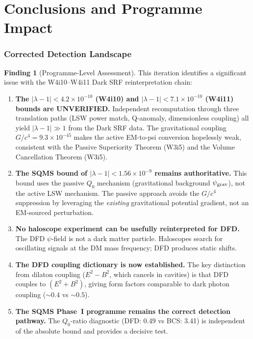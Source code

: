 \documentclass[11pt]{article}
\newcommand{\lbone}{|\lambda - 1|}
\newcommand{\ee}[1]{\times 10^{#1}}
\theoremstyle{definition}
\newtheorem{finding}[theorem]{Finding}
\theoremstyle{remark}
\begin{document}
\part{Conclusions and Programme Impact}
\label{part:conclusions}


\section{Corrected Detection Landscape}
\label{sec:corrected_landscape}

\begin{finding}[Programme-Level Assessment]
\label{find:programme}
This iteration identifies a significant issue with the W4i10--W4i11
Dark SRF reinterpretation chain:

\begin{enumerate}
\item \textbf{The $\lbone < 4.2\ee{-10}$ (W4i10) and $\lbone < 7.1\ee{-10}$
(W4i11) bounds are UNVERIFIED.} Independent recomputation through three
translation paths (LSW power match, Q-anomaly, dimensionless coupling)
all yield $\lbone \gg 1$ from the Dark SRF data. The gravitational
coupling $G/c^4 = 9.3\ee{-45}$ makes the active EM-to-psi conversion
hopelessly weak, consistent with the Passive Superiority Theorem (W3i5)
and the Volume Cancellation Theorem (W3i5).

\item \textbf{The SQMS bound of $\lbone < 1.56\ee{-9}$ remains
authoritative.} This bound uses the passive $Q_0$ mechanism (gravitational
background $\psi_{\rm grav}$), not the active LSW mechanism. The passive
approach avoids the $G/c^4$ suppression by leveraging the \emph{existing}
gravitational potential gradient, not an EM-sourced perturbation.

\item \textbf{No haloscope experiment can be usefully reinterpreted
for DFD.} The DFD $\psi$-field is not a dark matter particle. Haloscopes
search for oscillating signals at the DM mass frequency; DFD produces
static shifts.

\item \textbf{The DFD coupling dictionary is now established.} The
key distinction from dilaton coupling ($E^2 - B^2$, which cancels in
cavities) is that DFD couples to $(E^2 + B^2)$, giving form factors
comparable to dark photon coupling ($\sim 0.4$ vs $\sim 0.5$).

\item \textbf{The SQMS Phase~I programme remains the correct
detection pathway.} The $Q_0$-ratio diagnostic (DFD: 0.49 vs BCS: 3.41)
is independent of the absolute bound and provides a decisive test.
\end{enumerate}
\end{finding}
\end{document}
